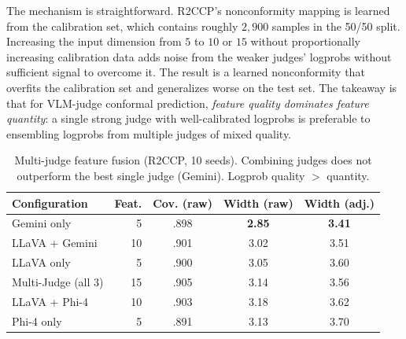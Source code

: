 \documentclass{article}
\begin{document}
The mechanism is straightforward. R2CCP's nonconformity mapping is learned from the calibration set, which contains roughly $2{,}900$ samples in the 50/50 split. Increasing the input dimension from $5$ to $10$ or $15$ without proportionally increasing calibration data adds noise from the weaker judges' logprobs without sufficient signal to overcome it. The result is a learned nonconformity that overfits the calibration set and generalizes worse on the test set. The takeaway is that for VLM-judge conformal prediction, \emph{feature quality dominates feature quantity}: a single strong judge with well-calibrated logprobs is preferable to ensembling logprobs from multiple judges of mixed quality.

\begin{table}[t]
\centering
\caption{Multi-judge feature fusion (R2CCP, 10 seeds). Combining judges does not outperform the best single judge (Gemini). Logprob quality $>$ quantity.}
\label{tab:multijudge_app}
\small
\begin{tabular}{lrccc}
\toprule
\textbf{Configuration} & \textbf{Feat.} & \textbf{Cov. (raw)} & \textbf{Width (raw)} & \textbf{Width (adj.)} \\
\midrule
Gemini only & 5 & .898 & \textbf{2.85} & \textbf{3.41} \\
LLaVA + Gemini & 10 & .901 & 3.02 & 3.51 \\
LLaVA only & 5 & .900 & 3.05 & 3.60 \\
Multi-Judge (all 3) & 15 & .905 & 3.14 & 3.56 \\
LLaVA + Phi-4 & 10 & .903 & 3.18 & 3.62 \\
Phi-4 only & 5 & .891 & 3.13 & 3.70 \\
\bottomrule
\end{tabular}
\end{table}
\end{document}
